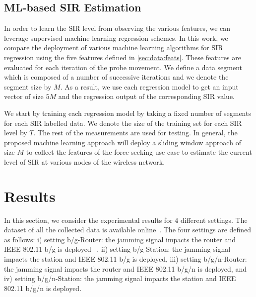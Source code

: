 	\subsection{ML-based SIR Estimation}\label{sec:data:ML}
   In order to learn the SIR level from observing the various features, we can leverage supervised machine learning regression schemes. 
   In this work, we compare the deployment of various machine learning algorithms for SIR regression using the five features defined in \ref{sec:data:feats}. These features are evaluated for each iteration of the probe movement. We define a data segment which is composed of a number of successive iterations and we denote the segment size by $M$. As a result, we use each regression model to get an input vector of size $5M$ and the regression output of the corresponding SIR value. 
   
   We start by training each regression model by taking a fixed number of segments for each SIR labelled data. We denote the size of the training set for each SIR level by $T$. The rest of the measurements are used for testing. In general, the proposed machine learning approach will deploy a sliding window approach of size $M$ to collect the features of the force-seeking use case to estimate the current level of SIR at various nodes of the wireless network. 
	
	\section{Results} \label{sec:results}  
	In this section, we consider the experimental results for 4 different settings. The dataset of all the collected data is available online~\cite{https://doi.org/10.18434/m32077}. The four settings are defined as follows: i) setting b/g-Router: the jamming signal impacts the router and IEEE 802.11 b/g is deployed ~\cite{IEEE802.11ac}, ii) setting b/g-Station: the jamming signal impacts the station and IEEE 802.11 b/g is deployed, iii) setting b/g/n-Router: the jamming signal impacts the router and IEEE 802.11 b/g/n is deployed, and iv) setting b/g/n-Station: the jamming signal impacts the station and IEEE 802.11 b/g/n is deployed.  
	
